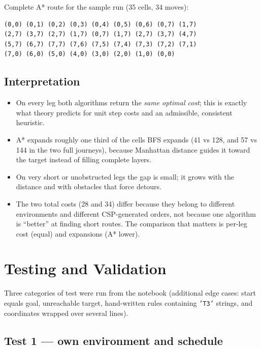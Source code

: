 \documentclass[11pt,a4paper]{article}
\newcommand{\code}[1]{\texttt{#1}}
\begin{document}
Complete A* route for the sample run (35 cells, 34 moves):
\begin{verbatim}
(0,0) (0,1) (0,2) (0,3) (0,4) (0,5) (0,6) (0,7) (1,7)
(2,7) (3,7) (2,7) (1,7) (0,7) (1,7) (2,7) (3,7) (4,7)
(5,7) (6,7) (7,7) (7,6) (7,5) (7,4) (7,3) (7,2) (7,1)
(7,0) (6,0) (5,0) (4,0) (3,0) (2,0) (1,0) (0,0)
\end{verbatim}

\subsection{Interpretation}

\begin{itemize}[leftmargin=1.2cm]
  \item On every leg both algorithms return the \emph{same optimal cost}; this is exactly what
        theory predicts for unit step costs and an admissible, consistent heuristic.
  \item A* expands roughly one third of the cells BFS expands (41 vs 128, and 57 vs 144 in the
        two full journeys), because Manhattan distance guides it toward the target instead of
        filling complete layers.
  \item On very short or unobstructed legs the gap is small; it grows with the distance and
        with obstacles that force detours.
  \item The two total costs (28 and 34) differ because they belong to different environments
        and different CSP-generated orders, not because one algorithm is ``better'' at finding
        short routes. The comparison that matters is per-leg cost (equal) and expansions
        (A* lower).
\end{itemize}

\section{Testing and Validation}

Three categories of test were run from the notebook (additional edge cases: start equals goal,
unreachable target, hand-written rules containing \code{'T3'} strings, and coordinates wrapped
over several lines).

\subsection{Test 1 --- own environment and schedule}
\end{document}
